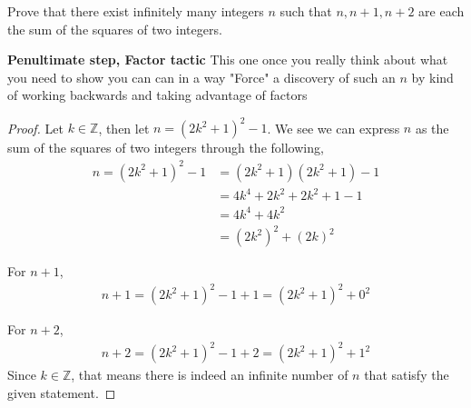 \documentclass[11pt]{article}
\newenvironment{problem}[2][Problem\!]{\begin{trivlist}
\item[\hskip \labelsep {\bfseries #1}\hskip \labelsep {\bfseries #2}]}{\end{trivlist}}
\newcommand{\zz}{\mathbb Z}   %
\begin{document}
\begin{tcolorbox}
    \begin{problem} {OC | 10/15 | 37 (Putnam)}
        Prove that there exist infinitely many integers $n$ such that $n,n+1,n +2$ are each the sum of the squares of two integers. 
    \end{problem}
    \textbf{Penultimate step, Factor tactic} This one once you really think about what you need to show you can can in a way "Force" a discovery of such an $n$ by kind of working backwards and taking advantage of factors
\end{tcolorbox}
\begin{proof}
    Let $k \in \zz$, then let $n = (2k^{2} + 1)^{2} -1$. We see we can express $n$ as the sum of the squares of two integers through the following,
    \begin{align*}
       n =  (2k^{2}+1)^{2} -1 &= (2k^{2} + 1)(2k^{2} + 1) -1 \\
        &= 4k^{4} +2k^{2} + 2k^{2} + 1 -1 \\
        &= 4k^{4} + 4k^{2} \\
        &= (2k^{2})^{2} + (2k)^{2}
    \end{align*}

    For $n+1$,
    \begin{align*}
         n +1 = (2k^{2} + 1)^{2} -1 + 1 = (2k^{2} + 1)^{2} + 0^{2}
    \end{align*}
    
    For $n+2$, 
    \begin{align*}
        n +2 = (2k^{2} +1)^{2} -1 + 2 = (2k^{2} +1)^{2} + 1^{2}
    \end{align*}
    Since $k \in \zz$, that means there is indeed an infinite number of $n$ that satisfy the given statement.
\end{proof}
\end{document}
